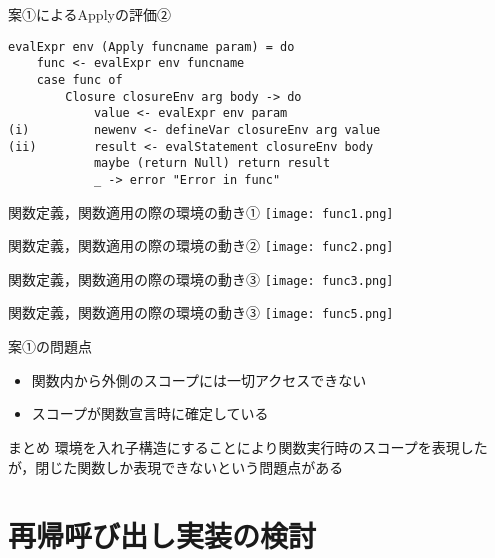 \documentclass[uplatex,dvipdfmx,ja=standard]{beamer}
\begin{document}
\begin{frame}[fragile]{案①によるApplyの評価②}

    \begin{verbatim}
evalExpr env (Apply funcname param) = do
    func <- evalExpr env funcname
    case func of 
        Closure closureEnv arg body -> do
            value <- evalExpr env param  
(i)         newenv <- defineVar closureEnv arg value
(ii)        result <- evalStatement closureEnv body 
            maybe (return Null) return result        
            _ -> error "Error in func"
    \end{verbatim}
\end{frame}


\begin{frame}{関数定義，関数適用の際の環境の動き①}
    \centering 
    \texttt{[image: func1.png]}
\end{frame}

\begin{frame}{関数定義，関数適用の際の環境の動き②}
    \centering 
    \texttt{[image: func2.png]}
\end{frame}

\begin{frame}{関数定義，関数適用の際の環境の動き③}
    \centering 
    \texttt{[image: func3.png]}
\end{frame}


\begin{frame}{関数定義，関数適用の際の環境の動き③}
    \centering 
    \texttt{[image: func5.png]}
\end{frame}

\begin{frame}{案①の問題点}
    \begin{itemize}
        \item 関数内から外側のスコープには一切アクセスできない
        \item スコープが関数宣言時に確定している
    \end{itemize}
\end{frame}

\begin{frame}{まとめ}
環境を入れ子構造にすることにより関数実行時のスコープを表現したが，閉じた関数しか表現できないという問題点がある
\end{frame}

\section{再帰呼び出し実装の検討}
\end{document}
